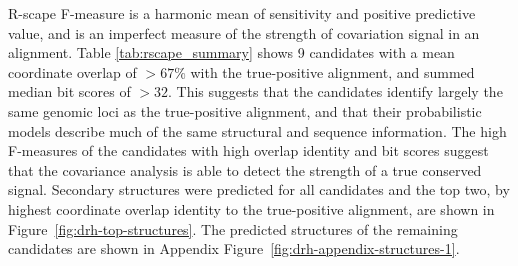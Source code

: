 R-scape F-measure is a harmonic mean of sensitivity and positive predictive value, and is an imperfect measure of the strength of covariation signal in an alignment.
Table \ref{tab:rscape_summary} shows 9 candidates with a mean coordinate overlap of $>67\%$ with the true-positive alignment, and summed median bit scores of $>32$.
This suggests that the candidates identify largely the same genomic loci as the true-positive alignment, and that their probabilistic models describe much of the same structural and sequence information.
The high F-measures of the candidates with high overlap identity and bit scores suggest that the covariance analysis is able to detect the strength of a true conserved signal.
Secondary structures were predicted for all candidates and the top two, by highest coordinate overlap identity to the true-positive alignment, are shown in Figure~\ref{fig:drh-top-structures}.
The predicted structures of the remaining candidates are shown in Appendix Figure~\ref{fig:drh-appendix-structures-1}.

